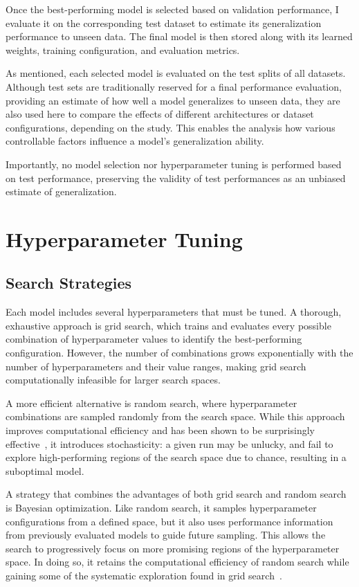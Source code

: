Once the best-performing model is selected based on validation performance, I evaluate it on the corresponding test dataset to estimate its generalization performance to unseen data. The final model is then stored along with its learned weights, training configuration, and evaluation metrics.

As mentioned, each selected model is evaluated on the test splits of all datasets. Although test sets are traditionally reserved for a final performance evaluation, providing an estimate of how well a model generalizes to unseen data, they are also used here to compare the effects of different architectures or dataset configurations, depending on the study. This enables the analysis how various controllable factors influence a model's generalization ability. 

Importantly, no model selection nor hyperparameter tuning is performed based on test performance, preserving the validity of test performances as an unbiased estimate of generalization.

\section{Hyperparameter Tuning}\label{HyperparameterTuning}

\subsection{Search Strategies}

Each model includes several hyperparameters that must be tuned. A thorough, exhaustive approach is grid search, which trains and evaluates every possible combination of hyperparameter values to identify the best-performing configuration. However, the number of combinations grows exponentially with the number of hyperparameters and their value ranges, making grid search computationally infeasible for larger search spaces. 

A more efficient alternative is random search, where hyperparameter combinations are sampled randomly from the search space. While this approach improves computational efficiency and has been shown to be surprisingly effective~\cite{bergstra2012random}, it introduces stochasticity: a given run may be unlucky, and fail to explore high-performing regions of the search space due to chance, resulting in a suboptimal model.

A strategy that combines the advantages of both grid search and random search is Bayesian optimization. Like random search, it samples hyperparameter configurations from a defined space, but it also uses performance information from previously evaluated models to guide future sampling. This allows the search to progressively focus on more promising regions of the hyperparameter space. In doing so, it retains the computational efficiency of random search while gaining some of the systematic exploration found in grid search~\cite{snoek2012practical}.

